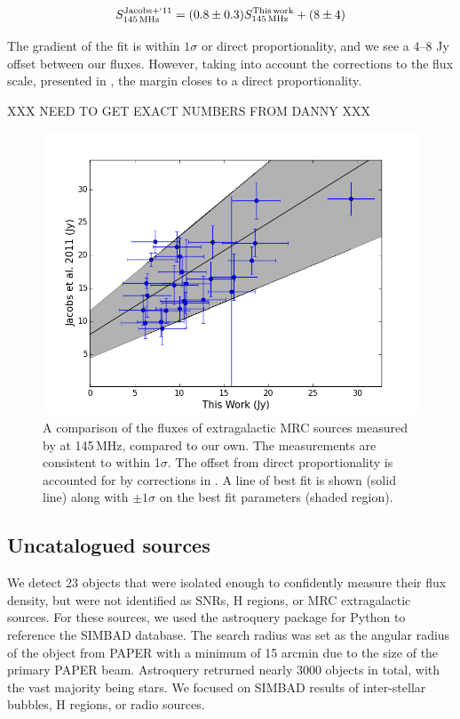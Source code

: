 \documentclass[useAMS,usenatbib]{mn2e}
\begin{document}
\begin{equation}
S_{145\,\rm{MHz}}^{\rm{Jacobs+`11}} = (0.8\pm0.3) S_{145\,\rm{MHz}}^{\rm{This\,work}} + (8\pm4)
\label{eq:PScal}
\end{equation}

The gradient of the fit is within $1\sigma$ or direct proportionality, and we see a 4--8 Jy offset between our fluxes. However, taking into account the corrections to the \cite{Jacobs.11} flux scale, presented in \cite[][see Section 3 of their paper]{Jacobs.13}, the margin closes to a direct proportionality. 

XXX NEED TO GET EXACT NUMBERS FROM DANNY XXX

\begin{figure}
\includegraphics[width=\columnwidth]{figs/Jacobs_Comparison.png}
\caption{A comparison of the fluxes of extragalactic MRC sources measured by \protect\cite{Jacobs.11} at 145\,MHz, compared to our own. The measurements are consistent to within 1$\sigma$. The offset from direct proportionality is accounted for by corrections in \protect\cite[][see Section 3 of their paper]{Jacobs.13}.  A line of best fit is shown (solid line) along with $\pm1\sigma$ on the best fit parameters (shaded region).}
\label{fig:exgal}
\end{figure}

\subsection{Uncatalogued sources}

We detect 23 objects that were isolated enough to confidently measure their flux density, but were not identified as SNRs, {H} regions, or MRC extragalactic sources.  For these sources, we used the astroquery package for Python to reference the SIMBAD database.  The search radius was set as the angular radius of the object from PAPER with a minimum of 15 arcmin due to the size of the primary PAPER beam.  Astroquery retrurned nearly 3000 objects in total, with the vast majority being stars.  We focused on SIMBAD results of inter-stellar bubbles,  {H} regions, or radio sources.  
\end{document}
